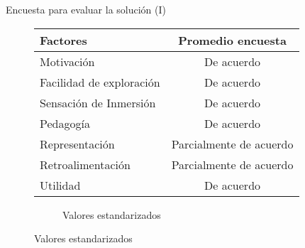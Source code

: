 \begin{frame}{Encuesta para evaluar la solución (I)}

\begin{figure}
    \scriptsize
    \centering
    \begin{subtable}[b]{.5\linewidth}
        \tiny
        \begin{tabular}{lc}
        \toprule
        Factores                 & Promedio encuesta \\
        \midrule
        Motivación               & De acuerdo \\
        Facilidad de exploración & De acuerdo \\
        Sensación de Inmersión   & De acuerdo \\
        Pedagogía                & De acuerdo \\
        Representación           & Parcialmente de acuerdo \\
        Retroalimentación        & Parcialmente de acuerdo \\
        Utilidad                 & De acuerdo \\
        \bottomrule
        \end{tabular}
        \caption{Aceptación por aspecto de la solución}
    \end{subtable}\hfill
    \pause
    \begin{subfigure}[b]{.5\linewidth}
        \tiny
        \caption{Valores estandarizados}
    \end{subfigure}
\end{figure}

\end{frame}

